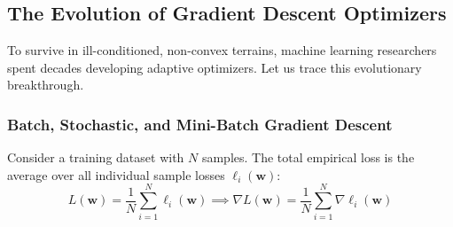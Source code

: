 \subsection{The Evolution of Gradient Descent Optimizers}\label{subsec:opt_gradient_algorithms}

To survive in ill-conditioned, non-convex terrains, machine learning researchers spent decades developing adaptive optimizers. Let us trace this evolutionary breakthrough.

\subsubsection{Batch, Stochastic, and Mini-Batch Gradient Descent}
Consider a training dataset with $N$ samples. The total empirical loss is the average over all individual sample losses $\ell_i(\mathbf{w})$:
\begin{equation}
L(\mathbf{w}) = \frac{1}{N} \sum_{i=1}^{N} \ell_i(\mathbf{w}) \implies \nabla L(\mathbf{w}) = \frac{1}{N} \sum_{i=1}^{N} \nabla \ell_i(\mathbf{w})\label{eq:batch_gradient_sum}
\end{equation}

